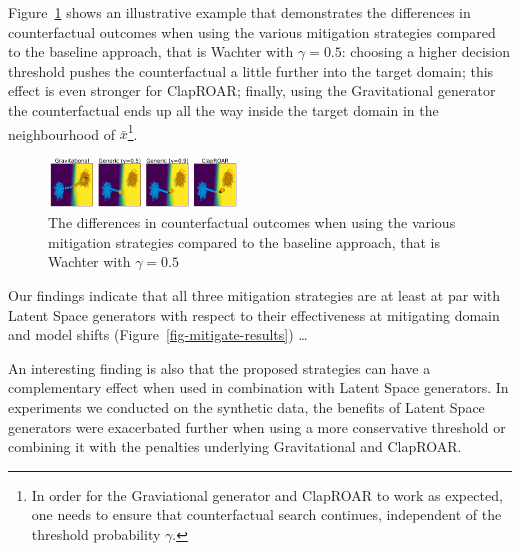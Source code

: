 \documentclass[
  conference]{IEEEtran}
\begin{document}
Figure~\ref{fig-mitigation} shows an illustrative example that
demonstrates the differences in counterfactual outcomes when using the
various mitigation strategies compared to the baseline approach, that is
Wachter with \(\gamma=0.5\): choosing a higher decision threshold pushes
the counterfactual a little further into the target domain; this effect
is even stronger for ClapROAR; finally, using the Gravitational
generator the counterfactual ends up all the way inside the target
domain in the neighbourhood of \(\bar{x}\)\footnote{In order for the
  Graviational generator and ClapROAR to work as expected, one needs to
  ensure that counterfactual search continues, independent of the
  threshold probability \(\gamma\).}.

\begin{figure}

{\centering \includegraphics[width=0.45\textwidth,height=\textheight]{www/mitigation.png}

}

\caption{\label{fig-mitigation}The differences in counterfactual
outcomes when using the various mitigation strategies compared to the
baseline approach, that is Wachter with \(\gamma=0.5\)}

\end{figure}

Our findings indicate that all three mitigation strategies are at least
at par with Latent Space generators with respect to their effectiveness
at mitigating domain and model shifts
(Figure~\ref{fig-mitigate-results}) \ldots{}

An interesting finding is also that the proposed strategies can have a
complementary effect when used in combination with Latent Space
generators. In experiments we conducted on the synthetic data, the
benefits of Latent Space generators were exacerbated further when using
a more conservative threshold or combining it with the penalties
underlying Gravitational and ClapROAR.
\end{document}
